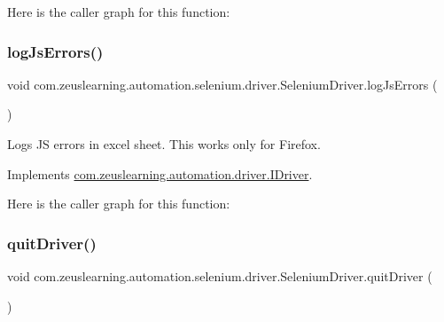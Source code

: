 Here is the caller graph for this function\+:
\hypertarget{classcom_1_1zeuslearning_1_1automation_1_1selenium_1_1driver_1_1SeleniumDriver_a1680730a2528d0c2029aca6c8eeacec3}{}\label{classcom_1_1zeuslearning_1_1automation_1_1selenium_1_1driver_1_1SeleniumDriver_a1680730a2528d0c2029aca6c8eeacec3} 
\subsubsection{\texorpdfstring{log\+Js\+Errors()}{logJsErrors()}}
{\footnotesize\ttfamily void com.\+zeuslearning.\+automation.\+selenium.\+driver.\+Selenium\+Driver.\+log\+Js\+Errors (\begin{DoxyParamCaption}{ }\end{DoxyParamCaption})\hspace{0.3cm}{\ttfamily [inline]}}

Logs JS errors in excel sheet. This works only for Firefox. 

Implements \hyperlink{interfacecom_1_1zeuslearning_1_1automation_1_1driver_1_1IDriver_aa5d03e791046040c033f5f2b57e002ad}{com.\+zeuslearning.\+automation.\+driver.\+I\+Driver}.

Here is the caller graph for this function\+:
\hypertarget{classcom_1_1zeuslearning_1_1automation_1_1selenium_1_1driver_1_1SeleniumDriver_afc293d71e5e65ae445d5568accf2a253}{}\label{classcom_1_1zeuslearning_1_1automation_1_1selenium_1_1driver_1_1SeleniumDriver_afc293d71e5e65ae445d5568accf2a253} 
\subsubsection{\texorpdfstring{quit\+Driver()}{quitDriver()}}
{\footnotesize\ttfamily void com.\+zeuslearning.\+automation.\+selenium.\+driver.\+Selenium\+Driver.\+quit\+Driver (\begin{DoxyParamCaption}{ }\end{DoxyParamCaption})\hspace{0.3cm}{\ttfamily [inline]}}

